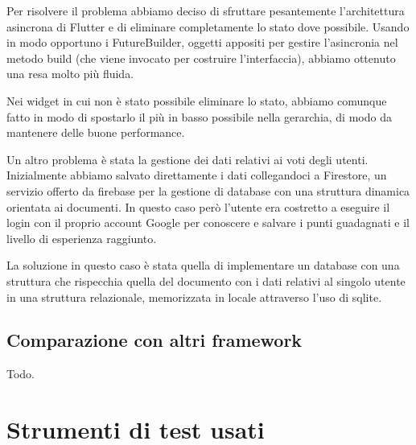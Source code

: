 Per risolvere il problema abbiamo deciso di sfruttare pesantemente l'architettura asincrona di Flutter e di eliminare completamente lo stato dove possibile.
Usando in modo opportuno i FutureBuilder, oggetti appositi per gestire l'asincronia nel metodo build (che viene invocato per costruire l'interfaccia), abbiamo ottenuto una resa molto più fluida.

Nei widget in cui non è stato possibile eliminare lo stato, abbiamo comunque fatto in modo di spostarlo il più in basso possibile nella gerarchia, di modo da mantenere delle buone performance.

Un altro problema è stata la gestione dei dati relativi ai voti degli utenti.
Inizialmente abbiamo salvato direttamente i dati collegandoci a Firestore, un servizio offerto da firebase per la gestione di database con una struttura dinamica orientata ai documenti.
In questo caso però l'utente era costretto a eseguire il login con il proprio account Google per conoscere e salvare i punti guadagnati e il livello di esperienza raggiunto.

La soluzione in questo caso è stata quella di implementare un database con una struttura che rispecchia quella del documento con i dati relativi al singolo utente in una struttura relazionale, memorizzata in locale attraverso l'uso di sqlite.

\subsection{Comparazione con altri framework\label{sec:flutter-comparazione}}
Todo.

\section{Strumenti di test usati}
